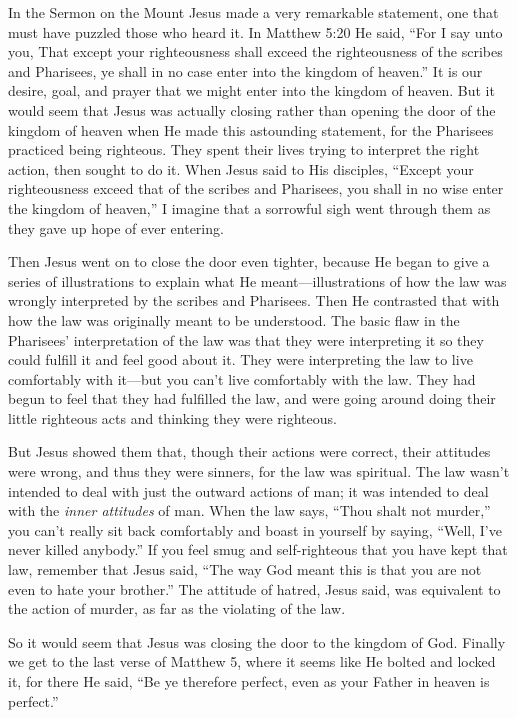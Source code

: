 In the Sermon on the Mount Jesus made a very remarkable
statement, one that must have puzzled those who
heard it. In Matthew 5:20 He said, “For I say unto you, That
except your righteousness shall exceed the righteousness of
the scribes and Pharisees, ye shall in no case enter into the
kingdom of heaven.” It is our desire, goal, and prayer that
we might enter into the kingdom of heaven. But it would
seem that Jesus was actually closing rather than opening
the door of the kingdom of heaven when He made this
astounding statement, for the Pharisees practiced being
righteous. They spent their lives trying to interpret the right
action, then sought to do it. When Jesus said to His disciples,
“Except your righteousness exceed that of the scribes
and Pharisees, you shall in no wise enter the kingdom of
heaven,” I imagine that a sorrowful sigh went through them
as they gave up hope of ever entering.

Then Jesus went on to close the door even tighter,
because He began to give a series of illustrations to explain
what He meant—illustrations of how the law was wrongly
interpreted by the scribes and Pharisees. Then He contrasted
that with how the law was originally meant to be
understood. The basic flaw in the Pharisees’ interpretation
of the law was that they were interpreting it so they could
fulfill it and feel good about it. They were interpreting the
law to live comfortably with it—but you can’t live comfortably
with the law. They had begun to feel that they had fulfilled
the law, and were going around doing their little righteous
acts and thinking they were righteous.

But Jesus showed them that, though their actions were
correct, their attitudes were wrong, and thus they were sinners,
for the law was spiritual. The law wasn’t intended to
deal with just the outward actions of man; it was intended
to deal with the \emph{inner attitudes} of man. When the law says,
“Thou shalt not murder,” you can’t really sit back comfortably
and boast in yourself by saying, “Well, I’ve never killed
anybody.” If you feel smug and self-righteous that you have
kept that law, remember that Jesus said, “The way God
meant this is that you are not even to hate your brother.”
The attitude of hatred, Jesus said, was equivalent to the
action of murder, as far as the violating of the law.

So it would seem that Jesus was closing the door to the
kingdom of God. Finally we get to the last verse of Matthew
5, where it seems like He bolted and locked it, for there He
said, “Be ye therefore perfect, even as your Father in heaven
is perfect.”


